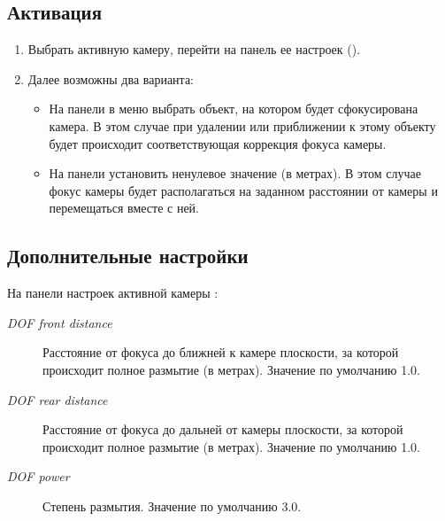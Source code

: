\documentclass[a4paper,12pt,oneside]{sphinxmanual}
\begin{document}
\subsection{Активация}
\label{postprocessing_effects:id6}\begin{enumerate}
\item {} 
Выбрать активную камеру, перейти на панель ее настроек ().

\item {} 
Далее возможны два варианта:
\begin{itemize}
\item {} 
На панели  в меню  выбрать объект, на котором будет сфокусирована камера. В этом случае при удалении или приближении к этому объекту будет происходит соответствующая коррекция фокуса камеры.

\item {} 
На панели  установить ненулевое значение  (в метрах). В этом случае фокус камеры будет располагаться на заданном расстоянии от камеры и перемещаться вместе с ней.

\end{itemize}

\end{enumerate}


\subsection{Дополнительные настройки}
\label{postprocessing_effects:id7}
На панели настроек активной камеры :
\begin{description}
\item[{\emph{DOF front distance}}] \leavevmode
Расстояние от фокуса до ближней к камере плоскости, за которой происходит полное размытие (в метрах). Значение по умолчанию 1.0.

\item[{\emph{DOF rear distance}}] \leavevmode
Расстояние от фокуса до дальней от камеры плоскости, за которой происходит полное размытие (в метрах). Значение по умолчанию 1.0.

\item[{\emph{DOF power}}] \leavevmode
Степень размытия. Значение по умолчанию 3.0.

\end{description}
\end{document}
